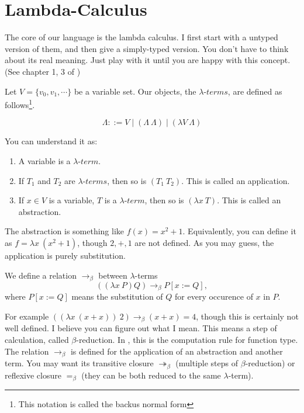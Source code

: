 \section{Lambda-Calculus}
The core of our language is the lambda calculus. I first start with a
untyped version of them, and then give a simply-typed version. You don't
have to think about its real meaning. Just play with it until you are
happy with this concept. (See chapter 1, 3 of \cite{Curry-Howard})

Let 
$V=\{v_0, v_1, \cdots\}$ be a variable set. Our objects, the 
$\lambda$-$terms$, are defined as follows\footnote{This notation is
called the backus normal form}. 

\begin{definition}\label{lambda-term}
    $$\Lambda ::= V \mid (\Lambda\ \Lambda) \mid (\lambda V\ \Lambda)$$
\end{definition}

You can understand it as:
\begin{enumerate}
    \item A variable is a $\lambda$-$term$.
    \item If $T_1$ and $T_2$ are $\lambda$-$terms$, then so is $(T_1\ T_2)$.
    This is called an application.
    \item If $x\in V$ is a variable, $T$ is a $\lambda$-$term$, then so
    is $(\lambda x\ T)$. This is called an abstraction. 
\end{enumerate}

The abstraction is something like $f(x) = x^2 + 1$. Equivalently, you
can define it as $f=\lambda x\ (x^2+1)$, though $2,+,1$ are not defined.
As you may guess, the application is purely substitution.

\begin{definition}\label{beta-reduction}
    We define a relation $\to_\beta$ between $\lambda$-terms
    $$((\lambda x\ P) Q) \to_\beta P[x:=Q],$$ where $P[x:=Q]$ means the 
    substitution of $Q$ for every occurence of $x$ in $P$. 
\end{definition}

For example $((\lambda x\ (x+x))\ 2)\to_\beta(x+x) = 4$, though
this is certainly not well defined. I believe you can figure out what
I mean. This means a step of calculation, called $\beta$-reduction.
In \cite{homotopy-type-theory}, this is the computation rule for function
type. The relation $\to_\beta$ is defined for the application of an 
abstraction and another term. You may want its transitive closure 
$\twoheadrightarrow_\beta$ (multiple steps of $\beta$-reduction) or 
reflexive closure $=_\beta$ (they can be both reduced to the same
$\lambda$-term).

